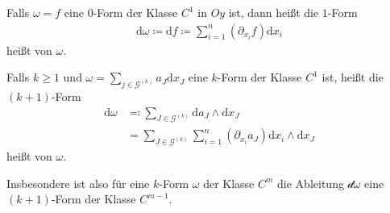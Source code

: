 \begin{theorem}[Differentiation] \label{8.3}
  \begin{enum-arab}
    \item
      Falls $\omega = f$ eine $0$-Form der Klasse $C^1$ in $Oy$ ist, dann heißt die $1$-Form
      \begin{align*}
        \mathrm d \omega \coloneq \mathrm df \coloneq \sum_{i=1}^n (\partial_{x_i} f) \mathrm d x_i
      \end{align*}
      heißt  von $\omega$.
    \item
      Falls $k \ge 1$ und $\omega = \sum_{j \in \mathcal{G}^{(k)}} a_J \mathrm d x_J$ eine $k$-Form der Klasse $C^1$ ist, heißt die $(k+1)$-Form
      \begin{align*}
        \mathrm d \omega &\eqcolon \sum_{J \in \mathcal{G}^{(k)}} \mathrm d a_J \wedge \mathrm d x_J \\
        &= \sum_{J \in \mathcal{G}^{(k)}} \sum_{i=1}^n (\partial_{x_i} a_J) \mathrm{d} x_i \wedge \mathrm d x_J
      \end{align*}
      heißt  von $\omega$.
  \end{enum-arab}
  Insbesondere ist also für eine $k$-Form $\omega$ der Klasse $C^m$ die Ableitung $\mathcal d \omega$ eine $(k+1)$-Form der Klasse $C^{m-1}$.
\end{theorem}

